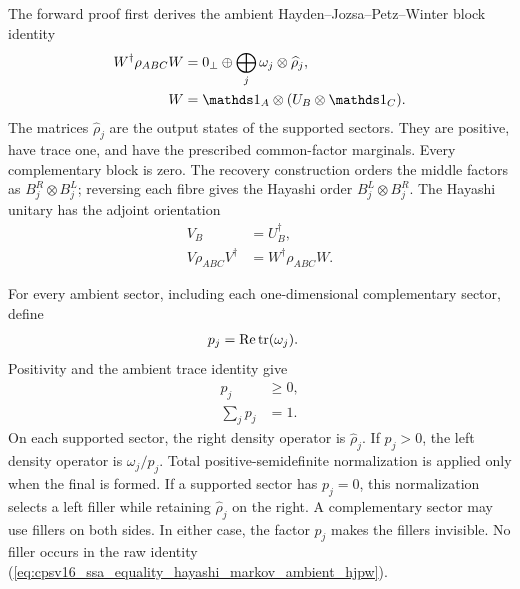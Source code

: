 \documentclass[11pt]{article}
\begin{document}
The forward proof first derives the ambient Hayden--Jozsa--Petz--Winter block
identity
\begin{align}
    W^\dagger\rho_{ABC}W
        &=0_\perp\oplus\bigoplus_j\omega_j\otimes\widehat\rho_j,
    \label{eq:cpsv16_ssa_equality_hayashi_markov_ambient_hjpw}\\
    W
        &=\Id_A\otimes(U_B\otimes\Id_C).
    \label{eq:cpsv16_ssa_equality_hayashi_markov_ambient_unitary}
\end{align}
The matrices $\widehat\rho_j$ are the output states of the supported sectors.
They are positive, have trace one, and have the prescribed common-factor
marginals. Every complementary block is zero. The recovery construction orders
the middle factors as $B_j^R\otimes B_j^L$; reversing each fibre gives the
Hayashi order $B_j^L\otimes B_j^R$. The Hayashi unitary has the adjoint
orientation
\begin{align}
    V_B
        &=U_B^\dagger,
    \label{eq:cpsv16_ssa_equality_hayashi_markov_hayashi_unitary}\\
    V\rho_{ABC}V^\dagger
        &=W^\dagger\rho_{ABC}W.
    \label{eq:cpsv16_ssa_equality_hayashi_markov_unitary_orientation}
\end{align}

For every ambient sector, including each one-dimensional complementary sector,
define
\begin{align}
    p_j
        &=\operatorname{Re}\operatorname{tr}(\omega_j).
    \label{eq:cpsv16_ssa_equality_hayashi_markov_sector_weight}
\end{align}
Positivity and the ambient trace identity give
\begin{align}
    p_j
        &\geq 0,
    \label{eq:cpsv16_ssa_equality_hayashi_markov_weight_nonnegative}\\
    \sum_jp_j
        &=1.
    \label{eq:cpsv16_ssa_equality_hayashi_markov_weight_normalization}
\end{align}
On each supported sector, the right density operator is $\widehat\rho_j$. If
$p_j>0$, the left density operator is $\omega_j/p_j$. Total
positive-semidefinite normalization is applied only when the final
 is formed. If a supported sector has
$p_j=0$, this normalization selects a left filler while retaining
$\widehat\rho_j$ on the right. A complementary sector may use fillers on both
sides. In either case, the factor $p_j$ makes the fillers invisible. No filler
occurs in the raw identity
(\ref{eq:cpsv16_ssa_equality_hayashi_markov_ambient_hjpw}).
\end{document}
